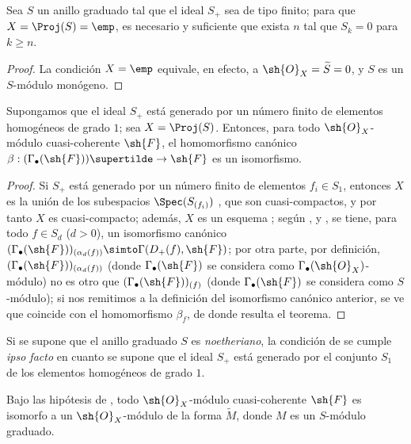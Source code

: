 \documentclass[oneside,10pt]{amsart}
\makeatletter
\renewcommand{\geq}{\geqslant}
\newcommand{\ega@arrow}[2]{\mathchoice{#1}{#2}{#2}{#2}}
\renewcommand{\to}{\ega@arrow{\longrightarrow}{\rightarrow}}
\let\EGAOriginalLabel\label
\renewcommand{\label}[1]{\phantomsection\EGAOriginalLabel{#1}}
\makeatother
\begin{document}
\begin{corollary}[2.7.4]
\label{II.2.7.4}
Sea $S$ un anillo graduado tal que el ideal $S_+$ sea de tipo finito; para que $X=\Proj(S)=\emp$, es necesario y suficiente que exista $n$ tal que $S_k=0$ para $k\geq n$.
\end{corollary}

\begin{proof}
La condición $X=\emp$ equivale, en efecto, a $\sh{O}_X=\widetilde{S}=0$, y $S$ es un $S$-módulo monógeno.
\end{proof}

\begin{theorem}[2.7.5]
\label{II.2.7.5}
Supongamos que el ideal $S_+$ está generado por un número finito de elementos homogéneos de grado $1$; sea $X=\Proj(S)$.
Entonces, para todo $\sh{O}_X$-módulo cuasi-coherente $\sh{F}$, el homomorfismo canónico $\beta:(\Gamma_\bullet(\sh{F}))\supertilde\to\sh{F}$  es un isomorfismo.
\end{theorem}

\begin{proof}
Si $S_+$ está generado por un número finito de elementos $f_i\in S_1$, entonces $X$ es la unión de los subespacios $\Spec(S_{(f_i)})$ , que son cuasi-compactos, y por tanto $X$ es cuasi-compacto; además, $X$ es un esquema ; según ,  y , se tiene, para todo $f\in S_d$ ($d>0$), un isomorfismo canónico $(\Gamma_\bullet(\sh{F}))_{(\alpha_d(f))}\simto\Gamma(D_+(f),\sh{F})$; por otra parte, por definición, $(\Gamma_\bullet(\sh{F}))_{(\alpha_d(f))}$ (donde $\Gamma_\bullet(\sh{F})$ se considera como $\Gamma_\bullet(\sh{O}_X)$-módulo) no es otro que $(\Gamma_\bullet(\sh{F}))_{(f)}$ (donde $\Gamma_\bullet(\sh{F})$ se considera como $S$-módulo); si nos remitimos a la definición  del isomorfismo canónico anterior, se ve que coincide con el homomorfismo $\beta_f$, de donde resulta el teorema.
\end{proof}

\begin{remark}[2.7.6]
\label{II.2.7.6}
Si se supone que el anillo graduado $S$ es \emph{noetheriano}, la condición de  se cumple \emph{ipso facto} en cuanto se supone que el ideal $S_+$ está generado por el conjunto $S_1$ de los elementos homogéneos de grado $1$.
\end{remark}

\begin{corollary}[2.7.7]
\label{II.2.7.7}
Bajo las hipótesis de , todo $\sh{O}_X$-módulo cuasi-coherente $\sh{F}$ es isomorfo a un $\sh{O}_X$-módulo de la forma $\widetilde{M}$, donde $M$ es un $S$-módulo graduado.
\end{corollary}
\end{document}
